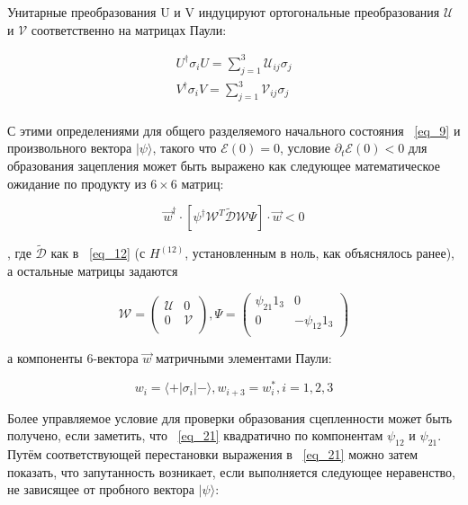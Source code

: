 \documentclass[11pt]{article}
\begin{document}
Унитарные преобразования U и V индуцируют ортогональные преобразования $\mathscr{U}$ и $\mathscr{V}$ соответственно на матрицах Паули:

\begin{equation}
\begin{gathered}
U^†\sigma_i U = \sum\limits_{j=1}^3 \mathscr{U}_{ij}\sigma_j \\
V^†\sigma_i V = \sum\limits_{j=1}^3 \mathscr{V}_{ij}\sigma_j \\
\end{gathered}
\label{eq_20}
\end{equation}

С этими определениями для общего разделяемого начального состояния ~\ref{eq_9} и произвольного вектора $|\psi\rangle$, такого что $\mathscr{E}(0)=0$, условие $\partial_t \mathscr{E}(0) < 0$ для образования зацепления может быть выражено как следующее математическое ожидание по продукту из $6 \times 6$ матриц:

\begin{equation}
\vec{w}^†\cdot [\psi^† \mathscr{W}^T \tilde{\mathscr{D}} \mathscr{W} \Psi] \cdot \vec{w} <0
\label{eq_21}
\end{equation}

, где $\tilde{\mathscr{D}}$ как в ~\ref{eq_12} (с $H^{(12)}$, установленным в ноль, как объяснялось ранее), а остальные матрицы задаются

\begin{equation}
\mathscr{W}= \left(
\begin{array}{cc}
\mathscr{U} & 0  \\
0 & \mathscr{V}  \\
\end{array}
\right),
\Psi = \left(
\begin{array}{cc}
\psi_{21}1_3 & 0 \\
0 & -\psi_{12}1_3 \\
\end{array}
\right)
\label{eq_22}
\end{equation}

а компоненты 6-вектора $\vec{w}$ матричными элементами Паули:

\begin{equation}
w_i=\langle+|\sigma_i | - \rangle , w_{i+3}=w_i^{*}, i=1,2,3
\label{eq_23}
\end{equation}

Более управляемое условие для проверки образования сцепленности может быть получено, если заметить, что ~\ref{eq_21} квадратично по компонентам $\psi_{12}$ и $\psi_{21}$. Путём соответствующей перестановки выражения в ~\ref{eq_21} можно затем показать, что запутанность возникает, если выполняется следующее неравенство, не зависящее от пробного вектора $|\psi \rangle$:
\end{document}
